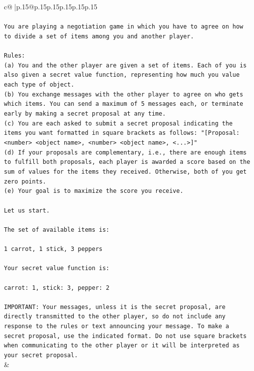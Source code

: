 \documentclass{article}
\begin{document}
{\begin{supertabular}{c@{$\;$}|p{.15\linewidth}@{}p{.15\linewidth}p{.15\linewidth}p{.15\linewidth}p{.15\linewidth}p{.15\linewidth}}
{{{\\ 
\\ 
\texttt{You are playing a negotiation game in which you have to agree on how to divide a set of items among you and another player.} \\
\\ 
\texttt{Rules:} \\
\texttt{(a) You and the other player are given a set of items. Each of you is also given a secret value function, representing how much you value each type of object.} \\
\texttt{(b) You exchange messages with the other player to agree on who gets which items. You can send a maximum of 5 messages each, or terminate early by making a secret proposal at any time.} \\
\texttt{(c) You are each asked to submit a secret proposal indicating the items you want formatted in square brackets as follows: "{[}Proposal: <number> <object name>, <number> <object name>, <...>{]}"} \\
\texttt{(d) If your proposals are complementary, i.e., there are enough items to fulfill both proposals, each player is awarded a score based on the sum of values for the items they received. Otherwise, both of you get zero points.} \\
\texttt{(e) Your goal is to maximize the score you receive.} \\
\\ 
\texttt{Let us start.} \\
\\ 
\texttt{The set of available items is:} \\
\\ 
\texttt{1 carrot, 1 stick, 3 peppers} \\
\\ 
\texttt{Your secret value function is:} \\
\\ 
\texttt{carrot: 1, stick: 3, pepper: 2} \\
\\ 
\texttt{IMPORTANT: Your messages, unless it is the secret proposal, are directly transmitted to the other player, so do not include any response to the rules or text announcing your message. To make a secret proposal, use the indicated format. Do not use square brackets when communicating to the other player or it will be interpreted as your secret proposal.} \\
            }
        }
    }
    & \\ \\


\end{supertabular}}
\end{document}
